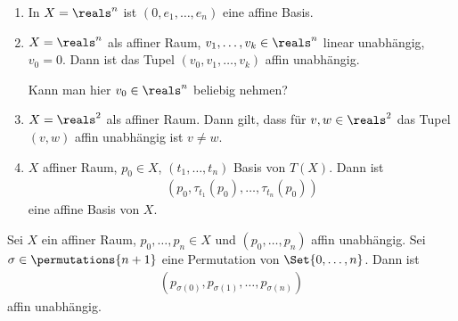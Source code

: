 \begin{beispiele*}
    \begin{enumerate}
        \item In \( X=\reals^n \) ist \( (0,e_1,\dotsc, e_n) \) eine affine Basis.
        \item \( X=\reals^n \) als affiner Raum, \( v_1,\dotsc, v_k\in \reals^n \) linear unabhängig, \( v_0=0 \). Dann ist das Tupel \( (v_0,v_1,\dotsc,v_k) \) affin unabhängig.
        \begin{frage*}
            Kann man hier \( v_0\in \reals^n \) beliebig nehmen?
        \end{frage*}
        \item \( X=\reals^2 \) als affiner Raum. Dann gilt, dass für \( v,w\in \reals^2 \) das Tupel \( (v,w) \) affin unabhängig ist \gdw \( v\neq w \).
        \item \( X \) affiner Raum, \( p_0\in X \), \( (t_1,\dotsc,t_n) \) Basis von \( T(X) \). Dann ist
        \begin{align*}
            (p_0,\tau_{t_1}(p_0),\dotsc, \tau_{t_n}(p_0))
        \end{align*}
        eine affine Basis von \( X \).
    \end{enumerate}
    
\end{beispiele*}
\begin{lemma}
    Sei \( X \) ein affiner Raum, \( p_0,\dotsc, p_n\in X \) und \( (p_0,\dotsc, p_n) \) affin unabhängig. Sei \( \sigma\in \permutations{n+1} \) eine Permutation von \( \Set{0,\dotsc,n} \). Dann ist
    \begin{align*}
        (p_{\sigma(0)},p_{\sigma(1)},\dotsc,p_{\sigma(n)})
    \end{align*}
    affin unabhängig.
\end{lemma}
